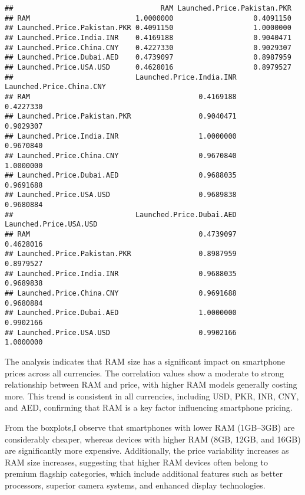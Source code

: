 \documentclass[
]{article}
\begin{document}
\begin{verbatim}
##                                   RAM Launched.Price.Pakistan.PKR
## RAM                         1.0000000                   0.4091150
## Launched.Price.Pakistan.PKR 0.4091150                   1.0000000
## Launched.Price.India.INR    0.4169188                   0.9040471
## Launched.Price.China.CNY    0.4227330                   0.9029307
## Launched.Price.Dubai.AED    0.4739097                   0.8987959
## Launched.Price.USA.USD      0.4628016                   0.8979527
##                             Launched.Price.India.INR Launched.Price.China.CNY
## RAM                                        0.4169188                0.4227330
## Launched.Price.Pakistan.PKR                0.9040471                0.9029307
## Launched.Price.India.INR                   1.0000000                0.9670840
## Launched.Price.China.CNY                   0.9670840                1.0000000
## Launched.Price.Dubai.AED                   0.9688035                0.9691688
## Launched.Price.USA.USD                     0.9689838                0.9680884
##                             Launched.Price.Dubai.AED Launched.Price.USA.USD
## RAM                                        0.4739097              0.4628016
## Launched.Price.Pakistan.PKR                0.8987959              0.8979527
## Launched.Price.India.INR                   0.9688035              0.9689838
## Launched.Price.China.CNY                   0.9691688              0.9680884
## Launched.Price.Dubai.AED                   1.0000000              0.9902166
## Launched.Price.USA.USD                     0.9902166              1.0000000
\end{verbatim}

The analysis indicates that RAM size has a significant impact on
smartphone prices across all currencies. The correlation values show a
moderate to strong relationship between RAM and price, with higher RAM
models generally costing more. This trend is consistent in all
currencies, including USD, PKR, INR, CNY, and AED, confirming that RAM
is a key factor influencing smartphone pricing.

From the boxplots,I observe that smartphones with lower RAM (1GB--3GB)
are considerably cheaper, whereas devices with higher RAM (8GB, 12GB,
and 16GB) are significantly more expensive. Additionally, the price
variability increases as RAM size increases, suggesting that higher RAM
devices often belong to premium flagship categories, which include
additional features such as better processors, superior camera systems,
and enhanced display technologies.
\end{document}
